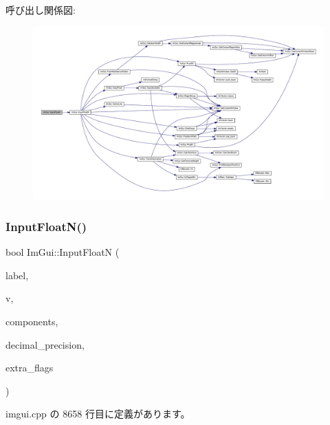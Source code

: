 呼び出し関係図\+:\nopagebreak
\begin{figure}[H]
\begin{center}
\leavevmode
\includegraphics[width=350pt]{namespace_im_gui_a2c9bbb9a99bd8fee134a196fd1ec3dfb_cgraph}
\end{center}
\end{figure}
\mbox{\label{namespace_im_gui_a7fe2c74d1c0042b77d8e6788faed0983}} 
\subsubsection{\texorpdfstring{Input\+Float\+N()}{InputFloatN()}}
{\footnotesize\ttfamily bool Im\+Gui\+::\+Input\+FloatN (\begin{DoxyParamCaption}\item[{const char $\ast$}]{label,  }\item[{float $\ast$}]{v,  }\item[{int}]{components,  }\item[{int}]{decimal\+\_\+precision,  }\item[{\mbox{\hyperlink{imgui_8h_a7d2c6153a6b9b5d3178ce82434ac9fb8}{Im\+Gui\+Input\+Text\+Flags}}}]{extra\+\_\+flags }\end{DoxyParamCaption})}



 imgui.\+cpp の 8658 行目に定義があります。

